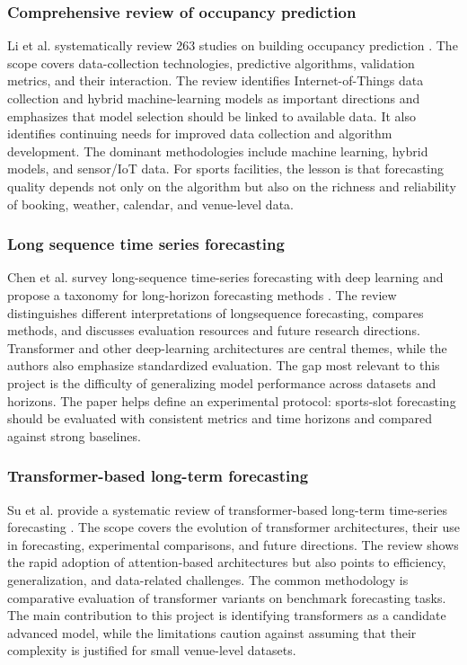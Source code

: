 \subsubsection{Comprehensive review of occupancy prediction}
Li et al. systematically review 263 studies on building occupancy prediction \cite{r18}. The scope covers data-collection technologies, predictive algorithms, validation metrics, and their interaction. The review identifies Internet-of-Things data collection and hybrid machine-learning models as important directions and emphasizes that model selection should be linked to available data. It also identifies continuing needs for improved data collection and algorithm development. The dominant methodologies include machine learning, hybrid models, and sensor/IoT data. For sports facilities, the lesson is that forecasting quality depends not only on the algorithm but also on the richness and reliability of booking, weather, calendar, and venue-level data.

\subsubsection{Long sequence time series forecasting}
Chen et al. survey long-sequence time-series forecasting with deep learning and propose a taxonomy for long-horizon forecasting methods \cite{r19}. The review distinguishes different interpretations of longsequence forecasting, compares methods, and discusses evaluation resources and future research directions. Transformer and other deep-learning architectures are central themes, while the authors also emphasize standardized evaluation. The gap most relevant to this project is the difficulty of generalizing model performance across datasets and horizons. The paper helps define an experimental protocol: sports-slot forecasting should be evaluated with consistent metrics and time horizons and compared against strong baselines.

\subsubsection{Transformer-based long-term forecasting}
Su et al. provide a systematic review of transformer-based long-term time-series forecasting \cite{r20}. The scope covers the evolution of transformer architectures, their use in forecasting, experimental comparisons, and future directions. The review shows the rapid adoption of attention-based architectures but also points to efficiency, generalization, and data-related challenges. The common methodology is comparative evaluation of transformer variants on benchmark forecasting tasks. The main contribution to this project is identifying transformers as a candidate advanced model, while the limitations caution against assuming that their complexity is justified for small venue-level datasets.

